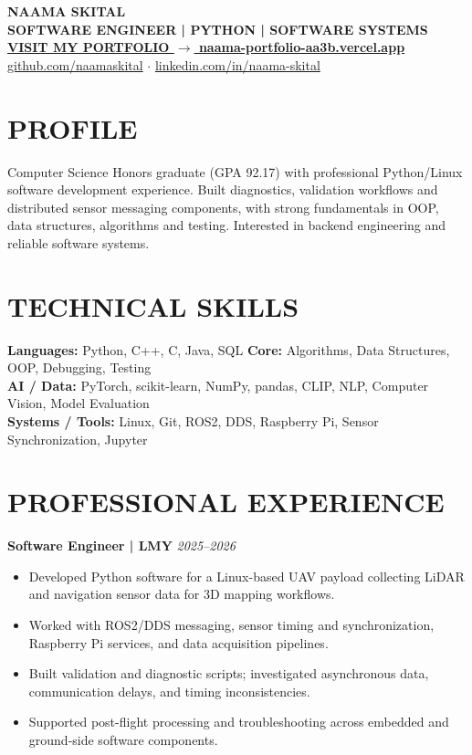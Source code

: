 \documentclass[10pt,a4paper]{article}
\begin{document}
\linespread{0.96}\selectfont
\begin{center}
{\fontsize{23}{26}\selectfont\bfseries\color{navy} NAAMA SKITAL}\\[3pt]
{\color{purple}\bfseries SOFTWARE ENGINEER \quad | \quad PYTHON \quad | \quad SOFTWARE SYSTEMS}\\[5pt]
{\fontsize{13}{16}\selectfont\bfseries\color{portfolioBlue}\href{https://naama-portfolio-aa3b.vercel.app/}{VISIT MY PORTFOLIO  $\longrightarrow$  naama-portfolio-aa3b.vercel.app}}\\[4pt]
\href{https://github.com/naamaskital}{github.com/naamaskital} \quad $\cdot$ \quad \href{https://www.linkedin.com/in/naama-skital/}{linkedin.com/in/naama-skital}
\end{center}
\section*{PROFILE}
Computer Science Honors graduate (GPA 92.17) with professional Python/Linux software development experience. Built diagnostics, validation workflows and distributed sensor messaging components, with strong fundamentals in OOP, data structures, algorithms and testing. Interested in backend engineering and reliable software systems.
\section*{TECHNICAL SKILLS}
\textbf{Languages:} Python, C++, C, Java, SQL \quad \textbf{Core:} Algorithms, Data Structures, OOP, Debugging, Testing\\
\textbf{AI / Data:} PyTorch, scikit-learn, NumPy, pandas, CLIP, NLP, Computer Vision, Model Evaluation\\
\textbf{Systems / Tools:} Linux, Git, ROS2, DDS, Raspberry Pi, Sensor Synchronization, Jupyter
\section*{PROFESSIONAL EXPERIENCE}
\textbf{Software Engineer \quad | \quad LMY} \hfill \textit{2025--2026}
\begin{itemize}
\item Developed Python software for a Linux-based UAV payload collecting LiDAR and navigation sensor data for 3D mapping workflows.
\item Worked with ROS2/DDS messaging, sensor timing and synchronization, Raspberry Pi services, and data acquisition pipelines.
\item Built validation and diagnostic scripts; investigated asynchronous data, communication delays, and timing inconsistencies.
\item Supported post-flight processing and troubleshooting across embedded and ground-side software components.
\end{itemize}
\end{document}
